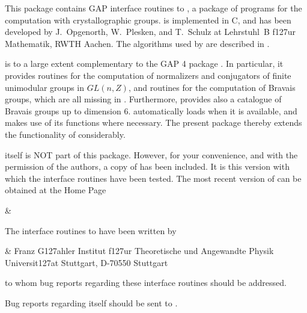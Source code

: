 

This package contains GAP interface routines to {\CARAT}, 
a package of programs for the computation with crystallographic
groups. {\CARAT} is implemented in C, and has been developed by
J.~Opgenorth, W.~Plesken, and T.~Schulz at Lehrstuhl~B f\accent127ur 
Mathematik, RWTH Aachen. The algorithms used by {\CARAT} are described 
in \cite{OPS98}. 

{\CARAT} is to a large extent complementary to the GAP 4 package
{\Cryst}. In particular, it provides routines for the computation 
of normalizers and conjugators of finite unimodular groups in $GL(n,Z)$,
and routines for the computation of Bravais groups, which are all 
missing in {\Cryst}.  Furthermore, {\CARAT} provides also a catalogue of 
Bravais groups up to dimension 6. {\Cryst} automatically loads {\CARAT}
when it is available, and makes use of its functions where necessary. 
The present package thereby extends the functionality of {\Cryst} 
considerably.

{\CARAT} itself is NOT part of this package. However, for your convenience,
and with the permission of the {\CARAT} authors, a copy of {\CARAT} 
has been included. It is this version with which the interface routines 
have been tested. The most recent version of {\CARAT} can be obtained at 
the {\CARAT} Home Page

\beginitems
&
\enditems
 
The {\GAP} interface routines to {\CARAT} have been written by

\beginitems
&
Franz G\accent127ahler\hfill\break
Institut f\accent127ur Theoretische und Angewandte Physik\hfill\break
Universit\accent127at Stuttgart, D-70550 Stuttgart\hfill\break
{}
\enditems

to whom bug reports regarding these interface routines should be
addressed. 

Bug reports regarding {\CARAT} itself should be sent to
.

